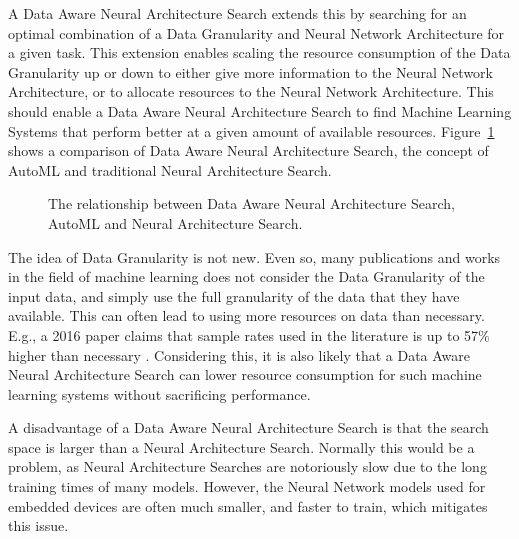 \documentclass{acaces}
\begin{document}
A Data Aware Neural Architecture Search extends this by searching for an optimal combination of a Data Granularity and Neural Network Architecture for a given task.
This extension enables scaling the resource consumption of the Data Granularity up or down to either give more information to the Neural Network Architecture, or to allocate resources to the Neural Network Architecture.
This should enable a Data Aware Neural Architecture Search to find Machine Learning Systems that perform better at a given amount of available resources.
Figure~\ref{fig:dnas} shows a comparison of Data Aware Neural Architecture Search, the concept of AutoML and traditional Neural Architecture Search.

\begin{figure}
    \centering
    \caption{The relationship between Data Aware Neural Architecture Search, AutoML and Neural Architecture Search.}
    \label{fig:dnas}
\end{figure}

The idea of Data Granularity is not new.
Even so, many publications and works in the field of machine learning does not consider the Data Granularity of the input data, and simply use the full granularity of the data that they have available.
This can often lead to using more resources on data than necessary. 
E.g., a 2016 paper claims that sample rates used in the literature is up to 57\% higher than necessary \cite{khan2016optimising}.
Considering this, it is also likely that a Data Aware Neural Architecture Search can lower resource consumption for such machine learning systems without sacrificing performance.

A disadvantage of a Data Aware Neural Architecture Search is that the search space is larger than a Neural Architecture Search.
Normally this would be a problem, as Neural Architecture Searches are notoriously slow due to the long training times of many models.
However, the Neural Network models used for embedded devices are often much smaller, and faster to train, which mitigates this issue.
\end{document}
